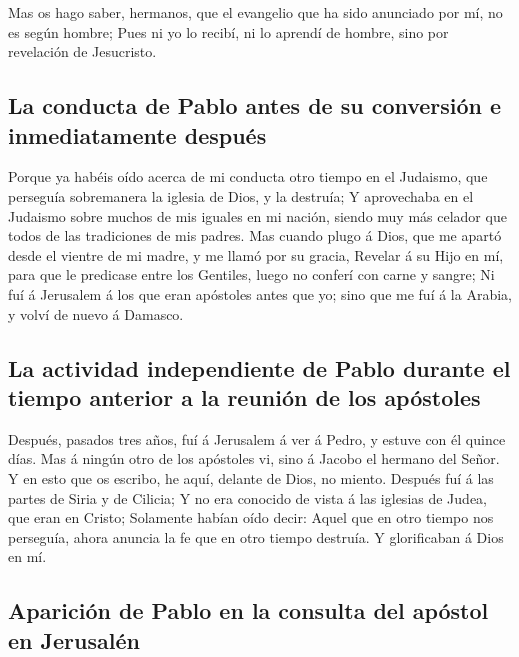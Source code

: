  Mas os hago saber, hermanos, que el evangelio que ha
sido anunciado por mí, no es según hombre;  Pues ni yo lo
recibí, ni lo aprendí de hombre, sino por revelación de Jesucristo.

\hypertarget{la-conducta-de-pablo-antes-de-su-conversiuxf3n-e-inmediatamente-despuuxe9s}{%
\subsection{La conducta de Pablo antes de su conversión e inmediatamente
después}\label{la-conducta-de-pablo-antes-de-su-conversiuxf3n-e-inmediatamente-despuuxe9s}}

 Porque ya habéis oído acerca de mi conducta otro tiempo
en el Judaismo, que perseguía sobremanera la iglesia de Dios, y la
destruía;  Y aprovechaba en el Judaismo sobre muchos de
mis iguales en mi nación, siendo muy más celador que todos de las
tradiciones de mis padres.  Mas cuando plugo á Dios, que
me apartó desde el vientre de mi madre, y me llamó por su gracia,
 Revelar á su Hijo en mí, para que le predicase entre los
Gentiles, luego no conferí con carne y sangre;  Ni fuí á
Jerusalem á los que eran apóstoles antes que yo; sino que me fuí á la
Arabia, y volví de nuevo á Damasco.

\hypertarget{la-actividad-independiente-de-pablo-durante-el-tiempo-anterior-a-la-reuniuxf3n-de-los-apuxf3stoles}{%
\subsection{La actividad independiente de Pablo durante el tiempo
anterior a la reunión de los
apóstoles}\label{la-actividad-independiente-de-pablo-durante-el-tiempo-anterior-a-la-reuniuxf3n-de-los-apuxf3stoles}}

 Después, pasados tres años, fuí á Jerusalem á ver á
Pedro, y estuve con él quince días.  Mas á ningún otro de
los apóstoles vi, sino á Jacobo el hermano del Señor.  Y
en esto que os escribo, he aquí, delante de Dios, no miento.
 Después fuí á las partes de Siria y de Cilicia;
 Y no era conocido de vista á las iglesias de Judea, que
eran en Cristo;  Solamente habían oído decir: Aquel que
en otro tiempo nos perseguía, ahora anuncia la fe que en otro tiempo
destruía.  Y glorificaban á Dios en mí.

\hypertarget{apariciuxf3n-de-pablo-en-la-consulta-del-apuxf3stol-en-jerusaluxe9n}{%
\subsection{Aparición de Pablo en la consulta del apóstol en
Jerusalén}\label{apariciuxf3n-de-pablo-en-la-consulta-del-apuxf3stol-en-jerusaluxe9n}}

